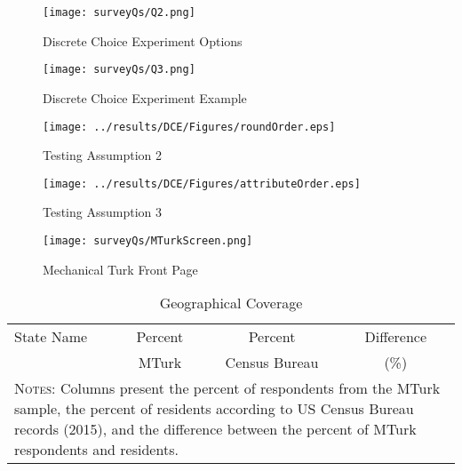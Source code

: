 \documentclass[a4paper, 11pt]{article}
\begin{document}
\begin{spacing}{1.4}
\begin{figure}[htpb!]
  \begin{center}
    \caption{Discrete Choice Experiment Options}
    \label{DCE-options}
  \texttt{[image: surveyQs/Q2.png]}
  \end{center}
\end{figure}

\begin{figure}[htpb!]
  \begin{center}
    \caption{Discrete Choice Experiment Example}
    \label{DCE-example}
  \texttt{[image: surveyQs/Q3.png]}
  \end{center}
\end{figure}


\begin{figure}[htpb!]
  \begin{center}
    \caption{Testing Assumption 2}
    \label{DCE-asm2}
  \texttt{[image: ../results/DCE/Figures/roundOrder.eps]}
  \end{center}
\end{figure}

\begin{figure}[htpb!]
  \begin{center}
    \caption{Testing Assumption 3}
    \label{DCE-asm2}
  \texttt{[image: ../results/DCE/Figures/attributeOrder.eps]}
  \end{center}
\end{figure}

\begin{landscape}
\begin{figure}[htpb!]
  \begin{center}
    \caption{Mechanical Turk Front Page}
    \label{MTurkAdd}
  \texttt{[image: surveyQs/MTurkScreen.png]}
  \end{center}
\end{figure}
\end{landscape}

\clearpage
\end{spacing}

\begingroup
\setlength{\LTleft}{-20cm plus -1fill}
\setlength{\LTright}{\LTleft}
\begin{longtable}{lccc} 
  \caption{Geographical Coverage} \label{tab:cover} \\
  \hline
  State Name & Percent & Percent & Difference \\
             & MTurk      & Census Bureau & (\%)          \\ \hline \endhead
  
  \hline 
  \multicolumn{4}{p{10.4cm}}{{\footnotesize\textsc{Notes:} Columns present the percent of respondents from the MTurk sample, the percent of residents according to US Census Bureau records (2015), and the difference between the percent of MTurk respondents and residents.}}
\end{longtable}
\endgroup
\end{document}
